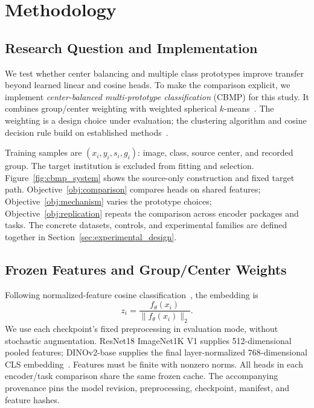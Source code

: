 \section{Methodology}
\label{sec:method}

\subsection{Research Question and Implementation}
We test whether center balancing and multiple class prototypes improve transfer beyond learned linear and cosine heads. To make the comparison explicit, we implement \emph{center-balanced multi-prototype classification} (CBMP) for this study. It combines group/center weighting with weighted spherical $k$-means~\cite{dhillon2001spherical}. The weighting is a design choice under evaluation; the clustering algorithm and cosine decision rule build on established methods~\cite{dhillon2001spherical,chen2019closer}.

Training samples are $(x_i,y_i,s_i,g_i)$: image, class, source center, and recorded group. The target institution is excluded from fitting and selection. Figure~\ref{fig:cbmp_system} shows the source-only construction and fixed target path. Objective~\ref{obj:comparison} compares heads on shared features; Objective~\ref{obj:mechanism} varies the prototype choices; Objective~\ref{obj:replication} repeats the comparison across encoder packages and tasks. The concrete datasets, controls, and experimental families are defined together in Section~\ref{sec:experimental_design}.


\subsection{Frozen Features and Group/Center Weights}
Following normalized-feature cosine classification~\cite{chen2019closer}, the embedding is
\begin{equation}
    z_i=\frac{f_\theta(x_i)}{\|f_\theta(x_i)\|_2}.
    \label{eq:normalized_features}
\end{equation}
We use each checkpoint's fixed preprocessing in evaluation mode, without stochastic augmentation. ResNet18 ImageNet1K V1 supplies 512-dimensional pooled features; DINOv2-base supplies the final layer-normalized 768-dimensional CLS embedding~\cite{he2016deep,oquab2024dinov2}. Features must be finite with nonzero norms. All heads in each encoder/task comparison share the same frozen cache. The accompanying provenance pins the model revision, preprocessing, checkpoint, manifest, and feature hashes.


